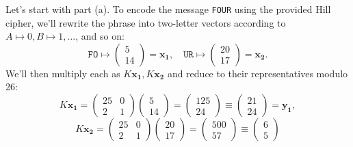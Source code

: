 \documentclass[12pt]{article}
\newenvironment{answer}
    {\begin{adjustwidth}{0pt}{0pt}}
    {\end{adjustwidth}}
\theoremstyle{remark}  %
\begin{document}
    \begin{answer}
        Let's start with part (a). To encode the message \texttt{FOUR} using the provided Hill cipher, we'll rewrite the phrase into two-letter vectors according to $A\mapsto 0, B\mapsto 1, \dots$, and so on: $$\texttt{FO} \mapsto \begin{pmatrix}
            5 \\
            14
        \end{pmatrix} = \mathbf{x_1},\quad \texttt{UR} \mapsto \begin{pmatrix}
            20 \\
            17
        \end{pmatrix} = \mathbf{x_2}.$$
        We'll then multiply each as $K\mathbf{x_1},K\mathbf{x_2}$ and reduce to their  representatives modulo 26: $$
            K\mathbf{x_1} = \begin{pmatrix}
                25 & 0 \\
                2 & 1
            \end{pmatrix}
            \begin{pmatrix}
                5 \\
                14
            \end{pmatrix} = 
            \begin{pmatrix}
                125 \\
                24
            \end{pmatrix} \equiv
            \begin{pmatrix}
                21 \\
                24
            \end{pmatrix} = \mathbf{y_1}, $$$$ K\mathbf{x_2} = 
            \begin{pmatrix}
                25 & 0 \\
                2 & 1
            \end{pmatrix}
            \begin{pmatrix}
                20 \\
                17
            \end{pmatrix} = 
            \begin{pmatrix}
                500 \\
                57
            \end{pmatrix} \equiv
            \begin{pmatrix}
                6 \\
                5

\end{pmatrix}$$
\end{answer}
\end{document}
